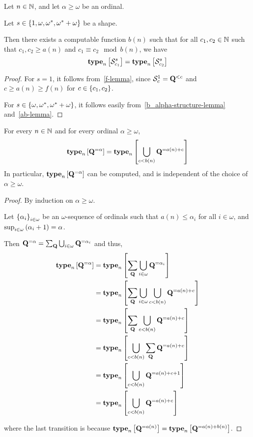 \begin{corollary}\label{s-alpha-finite}
    Let $n \in \mathbb{N}$, and let $\alpha \ge \omega$ be an ordinal.

    Let $s \in \left\{ {1, \omega, \omega^\ast, \omega^\ast + \omega} \right\}$ be a shape.

    Then there exists a computable function $b(n)$ such that
    for all $c_1, c_2 \in \mathbb{N}$ such that $c_1, c_2 \ge a(n)$ and $c_1 \equiv c_2 \mod b(n)$,
    we have
    \[\mathbf{type}_{n} \left[ {\mathcal{S}^{s}_{c_1}} \right] = \mathbf{type}_{n} \left[ {\mathcal{S}^{s}_{c_2}} \right]\]
\end{corollary}

\begin{proof}
    For $s = 1$, it follows from~\cref{f-lemma},
    since $\mathcal{S}^{1}_{c} = \mathbf{Q}^{< c}$
    and $c \ge a(n) \ge f(n)$ for $c \in \left\{ {c_1, c_2} \right\}$.

    For $s \in \left\{ {\omega, \omega^\ast, \omega^\ast + \omega} \right\}$, it follows easily from~\cref{b_alpha-structure-lemma}
    and~\cref{ab-lemma}.
\end{proof}

\begin{lemma}
    For every $n \in \mathbb{N}$ and for every ordinal $\alpha \ge \omega$,
    \[
        \mathbf{type}_{n} \left[ {\mathbf{Q}^{= \alpha}} \right] = \mathbf{type}_{n} \left[ {\bigcup_{c < b(n)}{\mathbf{Q}^{= a(n) + c}}} \right]
    \]
    In particular, $\mathbf{type}_{n} \left[ {\mathbf{Q}^{= \alpha}} \right]$ can be computed,
    and is independent of the choice of $\alpha \ge \omega$.
\end{lemma}

\begin{proof}
    By induction on $\alpha \ge \omega$.

    Let $\left\{ {\alpha_i} \right\}_{i \in \omega}$ be an $\omega$-sequence of ordinals
    such that $a(n) \le \alpha_i$ for all $i \in \omega$,
    and $\sup_{i \in \omega} \left( {\alpha_i + 1} \right) = \alpha$.

    Then $\mathbf{Q}^{= \alpha} = \sum_{\mathbf{Q}}{\bigcup_{i \in \omega} \mathbf{Q}^{= \alpha_i}}$ and thus,
    \begin{align*}
        \mathbf{type}_{n} \left[ {\mathbf{Q}^{= \alpha}} \right]
        &= \mathbf{type}_{n} \left[ {\sum_{\mathbf{Q}} \bigcup_{i \in \omega} \mathbf{Q}^{= \alpha_i}} \right] \\
        &= \mathbf{type}_{n} \left[ {\sum_{\mathbf{Q}} \bigcup_{i \in \omega} \bigcup_{c < b(n)}{\mathbf{Q}^{= a(n) + c}}} \right] \\
        &= \mathbf{type}_{n} \left[ {\sum_{\mathbf{Q}} \bigcup_{c < b(n)}{\mathbf{Q}^{= a(n) + c}}} \right] \\
        &= \mathbf{type}_{n} \left[ {\bigcup_{c < b(n)}{\sum_{\mathbf{Q}} \mathbf{Q}^{= a(n) + c}}} \right] \\
        &= \mathbf{type}_{n} \left[ {\bigcup_{c < b(n)}{\mathbf{Q}^{= a(n) + c + 1}}} \right] \\
        &= \mathbf{type}_{n} \left[ {\bigcup_{c < b(n)}{\mathbf{Q}^{= a(n) + c}}} \right]
    \end{align*}

    where the last transition is because $\mathbf{type}_{n} \left[ {\mathbf{Q}^{= a(n)}} \right] = \mathbf{type}_{n} \left[ {\mathbf{Q}^{= a(n) + b(n)}} \right]$.
\end{proof}

